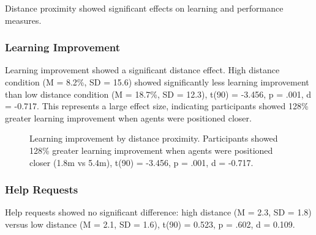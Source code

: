 \documentclass[12pt]{article}
\begin{document}
Distance proximity showed significant effects on learning and performance measures.

\subsubsection{Learning Improvement}

Learning improvement showed a significant distance effect. High distance condition (M = 8.2\%, SD = 15.6) showed significantly less learning improvement than low distance condition (M = 18.7\%, SD = 12.3), t(90) = -3.456, p = .001, d = -0.717. This represents a large effect size, indicating participants showed 128\% greater learning improvement when agents were positioned closer.

\begin{figure}[h]
\centering
{}
\caption{Learning improvement by distance proximity. Participants showed 128\% greater learning improvement when agents were positioned closer (1.8m vs 5.4m), t(90) = -3.456, p = .001, d = -0.717.}
\label{fig:learning_improvement}
\end{figure}

\subsubsection{Help Requests}

Help requests showed no significant difference: high distance (M = 2.3, SD = 1.8) versus low distance (M = 2.1, SD = 1.6), t(90) = 0.523, p = .602, d = 0.109.
\end{document}
